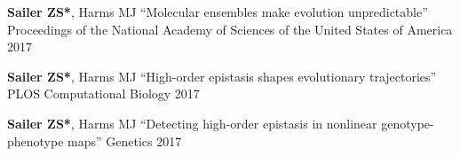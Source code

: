 

\begin{cvpublications}

  \cvpublication
    {\textbf{Sailer ZS*}, Harms MJ} %
    {``Molecular ensembles make evolution unpredictable''} %
    {Proceedings of the National Academy of Sciences of the United States of America} %
    {2017} %

  \cvpublication
    {\textbf{Sailer ZS*}, Harms MJ} %
    {``High-order epistasis shapes evolutionary trajectories''} %
    {PLOS Computational Biology} %
    {2017} %

  \cvpublication
    {\textbf{Sailer ZS*}, Harms MJ} %
    {``Detecting high-order epistasis in nonlinear genotype-phenotype maps''} %
    {Genetics} %
    {2017} %

\end{cvpublications}
